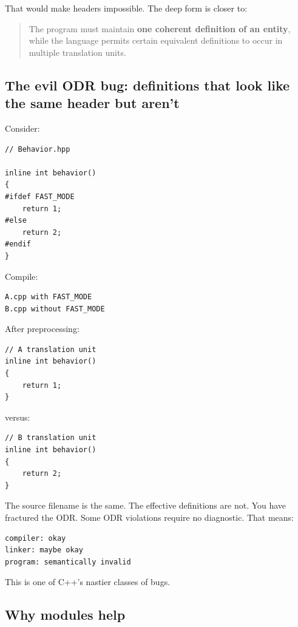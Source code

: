 That would make headers impossible. The deep form is closer to:

\begin{quote}
The program must maintain \textbf{one coherent definition of an entity}, while the language permits certain equivalent definitions to occur in multiple translation units.
\end{quote}

\subsection{The evil ODR bug: definitions that look like the same header but aren't}\label{05-engine-i-ch002-the-evil-odr-bug-definitions-that-look-like-the-same-header-but-arent}

Consider:

\begin{verbatim}
// Behavior.hpp

inline int behavior()
{
#ifdef FAST_MODE
    return 1;
#else
    return 2;
#endif
}
\end{verbatim}

Compile:

\begin{verbatim}
A.cpp with FAST_MODE
B.cpp without FAST_MODE
\end{verbatim}

After preprocessing:

\begin{verbatim}
// A translation unit
inline int behavior()
{
    return 1;
}
\end{verbatim}

versus:

\begin{verbatim}
// B translation unit
inline int behavior()
{
    return 2;
}
\end{verbatim}

The source filename is the same. The effective definitions are not. You have fractured the ODR. Some ODR violations require no diagnostic. That means:

\begin{verbatim}
compiler: okay
linker: maybe okay
program: semantically invalid
\end{verbatim}

This is one of C++'s nastier classes of bugs.

\subsection{Why modules help}\label{05-engine-i-ch002-why-modules-help}

